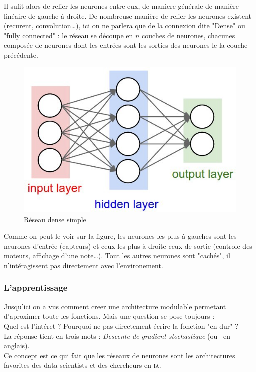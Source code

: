 Il sufit alors de relier les neurones entre eux, de maniere générale de manière linéaire de gauche à droite.
De nombreuse manière de relier les neurones existent (recurent, convolution\ldots),
ici on ne parlera que de la connexion dite "Dense" ou "fully connected" :
le réseau se découpe en $n$ couches de neurones,
chacunes composée de neurones dont les entrées sont les sorties des neurones le la couche précédente.
\begin{figure}[H]
    \center
    \includegraphics[height=\petit]{pict/net1.jpeg}
	\caption{Réseau dense simple}
	\label{fig:simple-dense}
\end{figure}
Comme on peut le voir sur la figure,
les neurones les plus à gauches sont les neurones d'entrée (capteurs)
et ceux les plus à droite ceux de sortie (controle des moteurs, affichage d'une note\ldots).
Tout les autres neurones sont "cachés", il n'intéragissent pas directement avec l'environement.


\subsubsection{L'apprentissage}
Jusqu'ici on a vus comment creer une architecture modulable permetant d'aproximer toute les fonctions.
Mais une question se pose toujours :\\
Quel est l'intéret ?
Pourquoi ne pas directement écrire la fonction "en dur" ?\\
La réponse tient en trois mots : \textit{Descente de gradient stochastique} (ou  \sgd\ en anglais). \\
Ce concept est ce qui fait que les réseaux de neurones sont les architectures favorites
des data scientists et des chercheurs en \textsc{ia}.\\


